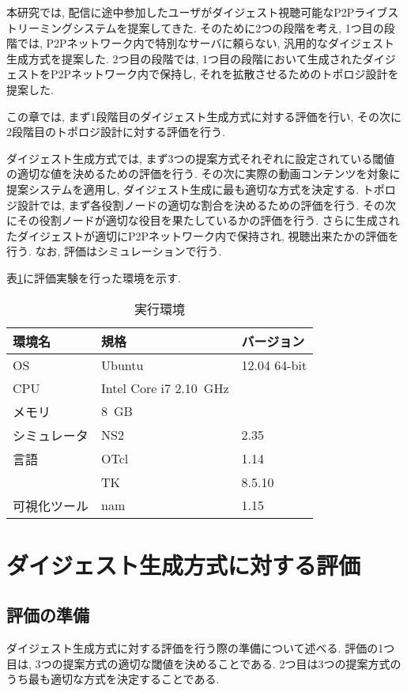 本研究では,  配信に途中参加したユーザがダイジェスト視聴可能なP2Pライブストリーミングシステムを提案してきた. そのために2つの段階を考え, 1つ目の段階では, P2Pネットワーク内で特別なサーバに頼らない, 汎用的なダイジェスト生成方式を提案した. 2つ目の段階では, 1つ目の段階において生成されたダイジェストをP2Pネットワーク内で保持し, それを拡散させるためのトポロジ設計を提案した.

この章では, まず1段階目のダイジェスト生成方式に対する評価を行い, その次に2段階目のトポロジ設計に対する評価を行う.

ダイジェスト生成方式では, まず3つの提案方式それぞれに設定されている閾値の適切な値を決めるための評価を行う. その次に実際の動画コンテンツを対象に提案システムを適用し, ダイジェスト生成に最も適切な方式を決定する. トポロジ設計では, まず各役割ノードの適切な割合を決めるための評価を行う. その次にその役割ノードが適切な役目を果たしているかの評価を行う. さらに生成されたダイジェストが適切にP2Pネットワーク内で保持され, 視聴出来たかの評価を行う. なお, 評価はシミュレーションで行う.

表\ref{tbl:env}に評価実験を行った環境を示す.

\begin{table}[h]
  \caption{実行環境}
  \label{tbl:env}
  \centering
      {\small
        \begin{tabular}{|l|l|l|} \hline
          環境名 & 規格 & バージョン \\ \hline \hline
          OS & Ubuntu & 12.04 64-bit  \\ \hline
          CPU & Intel Core i7 2.10~GHz & \\ \hline
          メモリ & 8~GB & \\ \hline
          シミュレータ & NS2 & 2.35 \\ \hline
          言語 & OTcl & 1.14 \\ \cline{2-3}
           & TK & 8.5.10 \\ \hline
          可視化ツール & nam & 1.15 \\ \hline
        \end{tabular}
      }
\end{table}

\newpage

\section{ダイジェスト生成方式に対する評価}\label{sec:ev-digest}
\subsection{評価の準備}
ダイジェスト生成方式に対する評価を行う際の準備について述べる. 評価の1つ目は, 3つの提案方式の適切な閾値を決めることである. 2つ目は3つの提案方式のうち最も適切な方式を決定することである.


